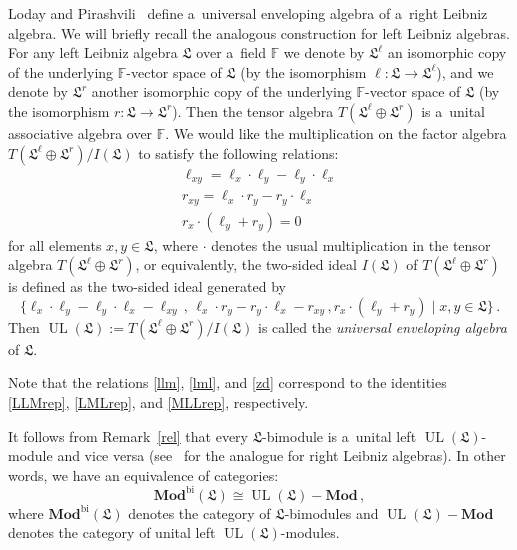 \documentclass{jonasart}
\DeclareMathOperator{\bi}{bi}
\DeclareMathOperator{\UL}{UL}
\newcommand{\fbb}{\mathbb{F}}
\newcommand{\lf}{\mathfrak{L}}
\newcommand{\Mod}{\mathbf{Mod}}
\begin{document}
	Loday and Pirashvili~\cite[Section 2]{LP1} define a~universal enveloping algebra of a~right Leibniz algebra. We will briefly recall the analogous construction for left Leibniz algebras. For any left Leibniz algebra $\lf$
	over a~field $\fbb$ we denote by $\lf^\ell$ an isomorphic copy of the underlying $\fbb$-vector space of $\lf$ (by the isomorphism $\ell:\lf\to
	\lf^\ell$), and we denote by $\lf^r$ another isomorphic copy of the underlying
	$\fbb$-vector space of $\lf$ (by the isomorphism $r:\lf\to\lf^r$). Then the tensor algebra $T(\lf^\ell\oplus\lf^r )$ is a~unital associative algebra over $\fbb$. We would like the multiplication on the factor algebra
	$T(\lf^\ell\oplus\lf^r )/I(\lf)$ to satisfy the following relations:
	\begin{gather}
		\ell_{xy}=\ell_x\cdot\ell_y -\ell_y\cdot\ell_x \label{llm} \\
		r_{xy}=\ell_x\cdot r_y -r_y\cdot\ell_x \label{lml} \\
		r_x\cdot(\ell_y +r_y )=0 \label{zd}
	\end{gather}
	for all elements $x,y\in\lf$, where $\cdot$ denotes the usual multiplication in the tensor algebra $T(\lf^\ell\oplus\lf^r )$, or equivalently, the two-sided ideal $I(\lf)$ of $T(\lf^\ell\oplus\lf^r )$ is defined as the two-sided ideal generated by
	\[
		\{\ell_x\cdot\ell_y -\ell_y\cdot\ell_x -\ell_{xy}\,,\,\ell_x\cdot r_y
		-r_y\cdot\ell_x -r_{xy}\,,r_x\cdot(\ell_y +r_y )\mid x,y\in\lf\}\,.
	\]
	Then $\UL(\lf):=T(\lf^\ell\oplus\lf^r )/I(\lf)$ is called the \emph{universal enveloping algebra\/} of $\lf$.
	\begin{remark}\label{rel}
		{Note that the relations \eqref{llm}, \eqref{lml}, and \eqref{zd}
		correspond to the identities \eqref{LLMrep}, \eqref{LMLrep}, and
		\eqref{MLLrep}, respectively.}
	\end{remark}
	It follows from Remark~\ref{rel} that every $\lf$-bimodule is a~unital left $\UL(\lf)$-module and vice versa (see~\cite[Theorem 2.3]{LP1}
	for the analogue for right Leibniz algebras). In other words, we have an equivalence of categories:
	\[
		\Mod^{\bi}(\lf)\cong\UL(\lf)-\Mod\,,
	\]
	where $\Mod^{\bi}(\lf)$ denotes the category of $\lf$-bimodules and
	$\UL(\lf)-\Mod$ denotes the category of unital left $\UL
	(\lf)$-modules.
\end{document}
